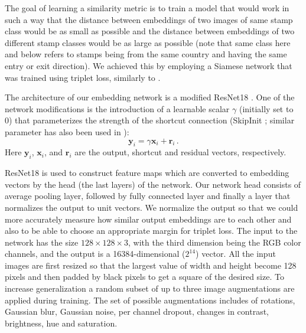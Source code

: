 \documentclass[twocolumn]{svjour3}
\begin{document}
The goal of learning a similarity metric is to train a model that would work in such a way that the distance between embeddings of two images of same stamp class would be as small as possible and the distance between embeddings of two different stamp classes would be as large as possible (note that same class here and below refers to stamps being from the same country and having the same entry or exit direction). We achieved this by employing a Siamese network that was trained using triplet loss, similarly to \cite{schroff_facenet_2015}.

The architecture of our embedding network is a modified ResNet18 \cite{He2016,he_bag_2018}. One of the network modifications is the introduction of a learnable scalar $\gamma$ (initially set to 0) that parameterizes the strength of the shortcut connection (SkipInit \cite{De2020_skipinit}; similar parameter has also been used in \cite{zhang_self-attention_2019}):
\begin{equation}
  \bm{y}_i = \gamma \bm{x}_i + \bm{r}_i\,.
\end{equation}
Here $\bm{y}_i$, $\bm{x}_i$, and $\bm{r}_i$ are the output, shortcut and residual vectors, respectively.

ResNet18 is used to construct feature maps which are converted to embedding vectors by the head (the last layers) of the network. Our network head consists of average pooling layer, followed by fully connected layer and finally a layer that normalizes the output to unit vectors. We normalize the output so that we could more accurately measure how similar output embeddings are to each other and also to be able to choose an appropriate margin for triplet loss. The input to the network has the size $128 \times 128 \times 3$, with the third dimension being the RGB color channels, and the output is a
16384-dimensional ($2^{14}$) vector. All the input images are first resized so that the largest value of width and height become 128 pixels and then padded by black pixels to get a square of the desired size. To increase generalization a random subset of up to three image augmentations are applied during training. The set of possible augmentations includes of rotations, Gaussian blur, Gaussian noise, per channel dropout, changes in contrast, brightness, hue and saturation.
\end{document}
